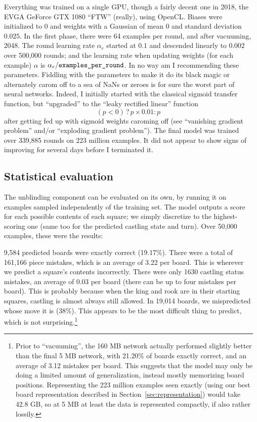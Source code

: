 \documentclass[twocolumn]{amsart}
\begin{document}
Everything was trained on a single GPU, though a fairly decent one in
2018, the EVGA GeForce GTX 1080 ``FTW'' (really), using OpenCL. Biases
were initialized to $0$ and weights with a Gaussian of mean $0$ and
standard deviation $0.025$. In the first phase, there were 64 examples
per round, and after vacuuming, 2048. The round learning rate
$\alpha_r$ started at $0.1$ and descended linearly to $0.002$ over
500,000 rounds; and the learning rate when updating weights (for each
example) $\alpha$ is $\alpha_r / \verb+examples_per_round+$. In no way
am I recommending these parameters. Fiddling with the parameters to
make it do its black magic or alternately carom off to a sea of NaNs
or zeroes is for sure the worst part of neural networks. Indeed, I
initially started with the classical sigmoid transfer function, but
``upgraded'' to the ``leaky rectified linear'' function
%
$$(p < 0) \,?\, p \times 0.01 : p$$
%
after getting fed up with sigmoid weights caroming off (see
``vanishing gradient problem'' and/or ``exploding gradient problem'').
The final model was trained over 339,885 rounds on 223 million
examples. It did not appear to show signs of improving for
several days before I terminated it.

\subsection{Statistical evaluation}

The unblinding component can be evaluated on its own, by running it on
examples sampled independently of the training set. The model outputs
a score for each possible contents of each square; we simply
discretize to the highest-scoring one (same too for the predicted
castling state and turn). Over 50,000 examples, these were the
results:

9,584 predicted boards were exactly correct (19.17\%). There were a
total of 161,166 piece mistakes, which is an average of 3.22 per
board. This is wherever we predict a square's contents incorrectly.
There were only 1630 castling status mistakes, an average of 0.03 per
board (there can be up to four mistakes per board). This is probably
because when the king and rook are in their starting squares, castling
is almost always still allowed. In 19,014 boards, we mispredicted
whose move it is (38\%). This appears to be the most difficult thing
to predict, which is not surprising.\footnote{ Prior to ``vacuuming'',
  the 160 MB network actually performed slightly better than the final
  5 MB network, with 21.20\% of boards exactly correct, and an average
  of 3.12 mistakes per board. This suggests that the model may only be
  doing a limited amount of generalization, instead mostly memorizing
  board positions. Representing the 223 million examples seen exactly
  (using our best board representation described in
  Section~\ref{sec:representation}) would take 42.8 GB, so at 5 MB at
  least the data is represented compactly, if also rather lossily.}
\end{document}
